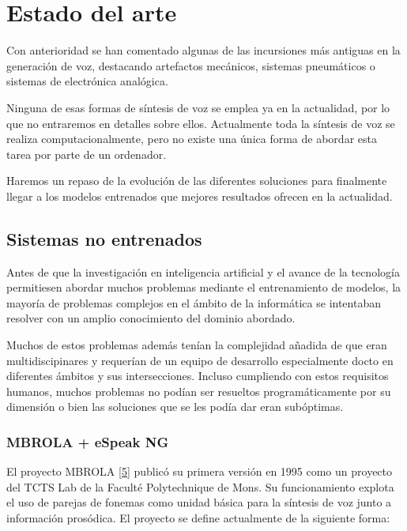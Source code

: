 \section{Estado del arte}


Con anterioridad se han comentado algunas de las incursiones más antiguas en la generación de voz, destacando artefactos mecánicos, sistemas pneumáticos o sistemas de electrónica analógica. 

Ninguna de esas formas de síntesis de voz se emplea ya en la actualidad, por lo que no entraremos en detalles sobre ellos. Actualmente toda la síntesis de voz se realiza computacionalmente, pero no existe una única forma de abordar esta tarea por parte de un ordenador.

Haremos un repaso de la evolución de las diferentes soluciones para finalmente llegar a los modelos entrenados que mejores resultados ofrecen en la actualidad.

\subsection{Sistemas no entrenados}

Antes de que la investigación en inteligencia artificial y el avance de la tecnología permitiesen abordar muchos problemas mediante el entrenamiento de modelos, la mayoría de problemas complejos en el ámbito de la informática se intentaban resolver con un amplio conocimiento del dominio abordado.

Muchos de estos problemas además tenían la complejidad añadida de que eran multidiscipinares y requerían de un equipo de desarrollo especialmente docto en diferentes ámbitos y sus intersecciones. 
Incluso cumpliendo con estos requisitos humanos, muchos problemas no podían ser resueltos programáticamente por su dimensión o bien las soluciones que se les podía dar eran subóptimas. 

\subsubsection{MBROLA + eSpeak NG}

El proyecto MBROLA \hyperref[EA_1]{[5]} publicó su primera versión en 1995 como un proyecto del TCTS Lab de la Faculté Polytechnique de Mons. Su funcionamiento explota el uso de parejas de fonemas como unidad básica para la síntesis de voz junto a información prosódica. 
El proyecto se define actualmente de la siguiente forma:

